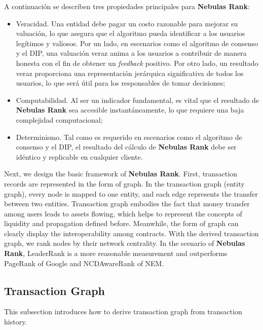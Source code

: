 A continuación se describen tres propiedades principales para \textbf{Nebulas Rank}:

\begin{itemize}

	\item Veracidad. Una entidad debe pagar un costo razonable para mejorar su valuación, lo que asegura que el algoritmo pueda identificar a los usuarios legítimos y valiosos. Por un lado, en escenarios como el algoritmo de consenso y el DIP, una valuación veraz anima a los usuarios a contribuir de manera honesta con el fin de obtener un \textit{feedback} positivo. Por otro lado, un resultado veraz proporciona una representación jerárquica significativa de todos los usuarios, lo que será útil para los responsables de tomar decisiones;

	\item Computabilidad. Al ser un indicador fundamental, es vital que el resultado de \textbf{Nebulas Rank} sea accesible instantáneamente, lo que requiere una baja complejidad computacional;

	\item Determinismo. Tal como es requerido en escenarios como el algoritmo de consenso y el DIP, el resultado del cálculo de \textbf{Nebulas Rank} debe ser idéntico y replicable en cualquier cliente.

\end{itemize}

Next, we design the basic framework of \textbf{Nebulas Rank}. First, transaction records are represented in the form of graph. In the transaction graph (entity graph), every node is mapped to one entity, and each edge represents the transfer between two entities\cite{Tschorsch2015}. Transaction graph embodies the fact that money transfer among users leads to assets flowing, which helps to represent the concepts of liquidity and propagation defined before. Meanwhile, the form of graph can clearly display the interoperability among contracts. With the derived transaction graph, we rank nodes by their network centrality. In the scenario of \textbf{Nebulas Rank}, LeaderRank\cite{Chen2013}\cite{Li2014} is a more reasonable measurement and outperforms PageRank of Google and NCDAwareRank of NEM\cite{nem}.

\subsection{Transaction Graph} \label{subsec:txg}
This subsection introduces how to derive transaction graph from transaction history.

